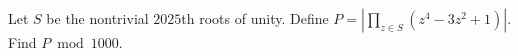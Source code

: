 Let $S$ be the nontrivial $2025$th roots of unity. Define $P=\left|\prod_{z\in S}(z^4-3z^2+1)\right|$. Find $P\bmod1000$.
